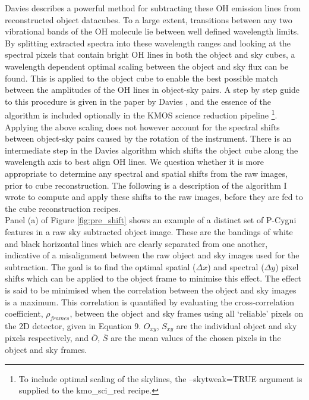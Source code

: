 \documentclass{literature}
\begin{document}
Davies \citep{Davies2007} describes a powerful method for subtracting these OH emission lines from reconstructed object datacubes. To a large extent, transitions between any two vibrational bands of the OH molecule lie between well defined wavelength limits. By splitting extracted spectra into these wavelength ranges and looking at the spectral pixels that contain bright OH lines in both the object and sky cubes, a wavelength dependent optimal scaling between the object and sky flux can be found. This is applied to the object cube to enable the best possible match between the amplitudes of the OH lines in object-sky pairs. A step by step guide to this procedure is given in the paper by Davies \citep{Davies2007}, and the essence of the algorithm is included optionally in the KMOS science reduction pipeline \footnote{To include optimal scaling of the skylines, the --skytweak=TRUE argument is supplied to the kmo\_sci\_red recipe.}. Applying the above scaling does not however account for the spectral shifts between object-sky pairs caused by the rotation of the instrument. There is an intermediate step in the Davies algorithm which shifts the object cube along the wavelength axis to best align OH lines. We question whether it is more appropriate to determine any spectral and spatial shifts from the raw images, prior to cube reconstruction. The following is a description of the algorithm I wrote to compute and apply these shifts to the raw images, before they are fed to the cube reconstruction recipes. \\ 

Panel (a) of Figure \ref{fig:pre_shift} shows an example of a distinct set of P-Cygni features in a raw sky subtracted object image. These are the bandings of white and black horizontal lines which are clearly separated from one another, indicative of a misalignment between the raw object and sky images used for the subtraction. The goal is to find the optimal spatial ($\Delta x$) and spectral ($\Delta y$) pixel shifts which can be applied to the object frame to minimise this effect. The effect is said to be minimised when the correlation between the object and sky images is a maximum. This correlation is quantified by evaluating the cross-correlation coefficient, $\rho _{frames}$, between the object and sky frames using all `reliable' pixels on the 2D detector, given in Equation 9. $O_{xy}$, $S_{xy}$ are the individual object and sky pixels respectively, and $\overline{O}$, $\overline{S}$ are the mean values of the chosen pixels in the object and sky frames. 
\end{document}
